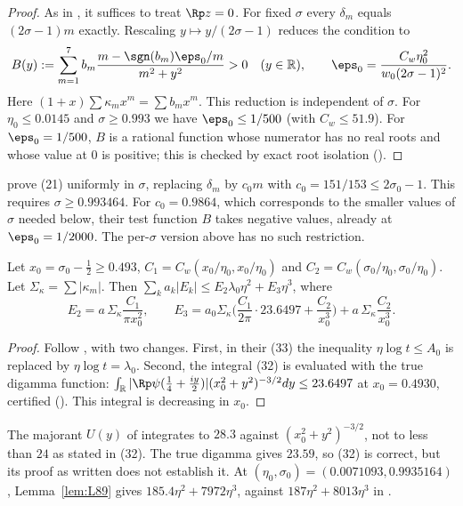 \begin{proof}
As in \cite{BTY}, it suffices to treat $\Rp z = 0$.
For fixed $\sigma$ every $\delta_m$ equals $(2\sigma-1)m$ exactly.
Rescaling $y \mapsto y/(2\sigma-1)$ reduces the condition to
\[
B(y) := \sum_{m=1}^{7} b_m\frac{m - \sgn(b_m)\eps_0/m}{m^2+y^2} > 0 \quad (y\in\mathbb R), \qquad \eps_0 = \frac{C_w\eta_0^2}{w_0(2\sigma-1)^2}.
\]
Here $(1+x)\sum\kappa_mx^m = \sum b_mx^m$.
This reduction is independent of $\sigma$.
For $\eta_0 \le 0.0145$ and $\sigma \ge 0.993$ we have $\eps_0 \le 1/500$ (with $C_w \le 51.9$).
For $\eps_0 = 1/500$, $B$ is a rational function whose numerator has no real roots and whose value at $0$ is positive; this is checked by exact root isolation ().
\end{proof}

\begin{remark}\label{rem:L5}
\cite{BTY} prove (21) uniformly in $\sigma$, replacing $\delta_m$ by $c_0m$ with $c_0 = 151/153 \le 2\sigma_0-1$.
This requires $\sigma \ge 0.993464$.
For $c_0 = 0.9864$, which corresponds to the smaller values of $\sigma$ needed below, their test function $B$ takes negative values, already at $\eps_0 = 1/2000$.
The per-$\sigma$ version above has no such restriction.
\end{remark}

\begin{lemma}\label{lem:L89}
Let $x_0 = \sigma_0 - \frac12 \ge 0.493$, $C_1 = C_w(x_0/\eta_0, x_0/\eta_0)$ and $C_2 = C_w(\sigma_0/\eta_0,\sigma_0/\eta_0)$.
Let $\Sigma_\kappa = \sum|\kappa_m|$. Then $\sum_k a_k|E_k| \le E_2\lambda_0\eta^2 + E_3\eta^3$, where
\[
E_2 = a\,\Sigma_\kappa\frac{C_1}{\pi x_0^2}, \qquad
E_3 = a_0\Sigma_\kappa\Big(\frac{C_1}{2\pi}\cdot 23.6497 + \frac{C_2}{x_0^3}\Big) + a\,\Sigma_\kappa\frac{C_2}{x_0^3} .
\]
\end{lemma}

\begin{proof}
Follow \cite[Lemma~8]{BTY}, with two changes.
First, in their (33) the inequality $\eta\log t \le A_0$ is replaced by $\eta\log t = \lambda_0$.
Second, the integral (32) is evaluated with the true digamma function:
$\int_{\mathbb R}|\Rp\psi(\frac14 + \frac{iy}2)|(x_0^2+y^2)^{-3/2}dy \le 23.6497$ at $x_0 = 0.4930$, certified ().
This integral is decreasing in $x_0$.
\end{proof}

\begin{remark}
The majorant $U(y)$ of \cite[(31)]{BTY} integrates to $28.3$ against $(x_0^2+y^2)^{-3/2}$, not to less than $24$ as stated in (32).
The true digamma gives $23.59$, so (32) is correct, but its proof as written does not establish it.
At $(\eta_0,\sigma_0) = (0.0071093, 0.9935164)$, Lemma~\ref{lem:L89} gives $185.4\eta^2 + 7972\eta^3$, against $187\eta^2 + 8013\eta^3$ in \cite[(48)]{BTY}.
\end{remark}

